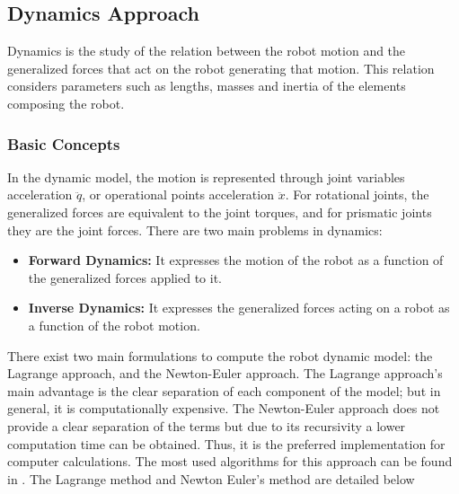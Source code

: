 \subsection{Dynamics Approach}

Dynamics is the study of the relation between the robot motion and the generalized forces that act on the robot generating that motion. This relation considers parameters such as lengths, 
masses and inertia of the elements composing the robot.



\subsubsection{Basic Concepts}

In the dynamic model, the motion is represented through joint variables acceleration $\ddot{q}$, or operational points acceleration $\ddot{x}$. For rotational joints, the generalized forces are equivalent to 
the joint torques, and for prismatic joints they are the joint forces. There are two main problems in dynamics:

\begin{itemize}
    \item \textbf{Forward Dynamics:} It expresses the motion of the robot as a function of the generalized forces applied to it.
    \item \textbf{Inverse Dynamics:} It expresses the generalized forces acting on a robot as a function of the robot motion.
\end{itemize}

There exist two main formulations to compute the robot dynamic model: the Lagrange approach, and the Newton-Euler approach. The Lagrange approach's main advantage is the clear separation 
of each component of the model; but in general, it is computationally expensive.
The Newton-Euler approach does not provide a clear separation of the terms but due to its recursivity a lower computation time can be obtained. Thus, it is 
the preferred implementation for computer calculations. The most used algorithms for this approach can be found in \cite{featherstone2000robot,featherstone2014rigid}. The Lagrange method and 
Newton Euler's method are detailed below %

